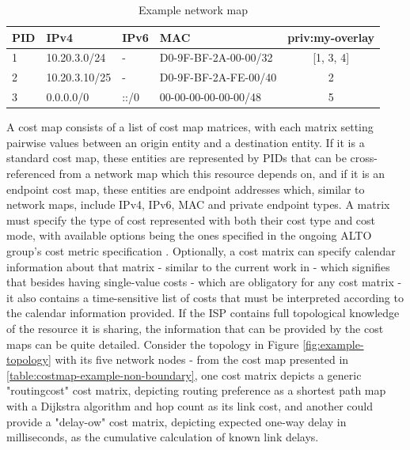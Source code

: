 \begin{table}[]
\centering
\begin{tabular}{|l|l|l|l|c|}
    \hline
PID  & IPv4          & IPv6                  & MAC                  & priv:my-overlay                     \\ \hline
1    & 10.20.3.0/24  & -                     & D0-9F-BF-2A-00-00/32 & [1, 3, 4]                           \\ \hline
2    & 10.20.3.10/25 & -                     & D0-9F-BF-2A-FE-00/40 & 2                                   \\ \hline
3    & 0.0.0.0/0     & ::/0                  & 00-00-00-00-00-00/48 & 5                                   \\ \hline
\end{tabular}
\caption{Example network map}
\label{table:networkmap-example}
\end{table}

    A cost map consists of a list of cost map matrices, with each matrix setting pairwise values between an origin entity and a destination entity.
    If it is a standard cost map, these entities are represented by PIDs that can be cross-referenced from a network map which this resource depends on, and if it is an endpoint cost map, these entities are endpoint addresses which, similar to network maps, include IPv4, IPv6, MAC and private endpoint types.
    A matrix must specify the type of cost represented with both their cost type and cost mode, with available options being the ones specified in the ongoing ALTO group's cost metric specification \cite{alto-cost-metrics(draft)}.
    Optionally, a cost matrix can specify calendar information about that matrix - similar to the current work in \cite{alto-calendar-cost-map(draft)} -  which signifies that besides having single-value costs - which are obligatory for any cost matrix - it also contains a time-sensitive list of costs that must be interpreted according to the calendar information provided.
    If the ISP contains full topological knowledge of the resource it is sharing, the information that can be provided by the cost maps can be quite detailed.
    Consider the topology in Figure \ref{fig:example-topology} with its five network nodes - from the cost map presented in \ref{table:costmap-example-non-boundary}, one cost matrix depicts a generic "routingcost" cost matrix, depicting routing preference as a shortest path map with a Dijkstra algorithm and hop count as its link cost, and another could provide a "delay-ow" cost matrix, depicting expected one-way delay in milliseconds, as the cumulative calculation of known link delays.


